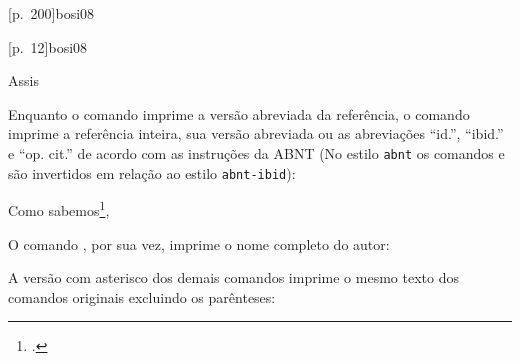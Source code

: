 \documentclass[a4paper]{article}
\begin{document}
\begin{example}
\citeyear{bosi08}
\end{example}

\begin{example}
\cites{mann09}{moretti09:1, moretti09}
\end{example}

\begin{example}
[p.~200]{bosi08}
\end{example}

\begin{example}
[p.~12]{bosi08}
\end{example}

\begin{example}
\end{example}

\begin{example}
Assis \cite[apud][p.~200]{bosi08}
\end{example}


Enquanto o comando \PVerb{\footcite} imprime a versão abreviada da referência, o comando \PVerb{\footcite*} imprime a referência inteira, sua versão
abreviada ou as abreviações ``id.'', ``ibid.'' e ``op. cit.'' de acordo com
as instruções da ABNT (No estilo \texttt{abnt} os comandos \PVerb{\footcite} e \PVerb{\footcite*} são invertidos em relação ao estilo \texttt{abnt-ibid}):

\begin{example}
Como sabemos\footcite*[Cf.][]{bosi08},
\end{example}

O comando \PVerb{\textcite*}, por sua vez, imprime o nome completo do autor:

\begin{example}
\textcite*{bosi08}
\end{example}

A versão com asterisco dos demais comandos imprime o mesmo texto dos comandos
originais excluindo os parênteses:

\begin{example}
\cite*{bosi08}
\end{example}

\begin{example}
\end{example}

\begin{example}
\citeauthor*{bosi08}
\end{example}
\end{document}
